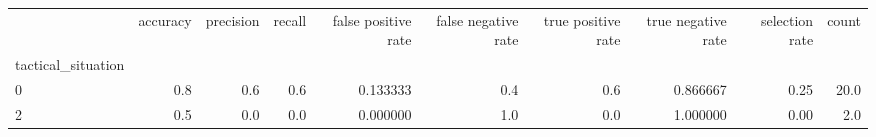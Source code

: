 \begin{tabular}{lrrrrrrrrr}
\toprule
{} &  accuracy &  precision &  recall &  false positive rate &  false negative rate &  true positive rate &  true negative rate &  selection rate &  count \\
tactical\_situation &           &            &         &                      &                      &                     &                     &                 &        \\
\midrule
0                  &       0.8 &        0.6 &     0.6 &             0.133333 &                  0.4 &                 0.6 &            0.866667 &            0.25 &   20.0 \\
2                  &       0.5 &        0.0 &     0.0 &             0.000000 &                  1.0 &                 0.0 &            1.000000 &            0.00 &    2.0 \\
\bottomrule
\end{tabular}
